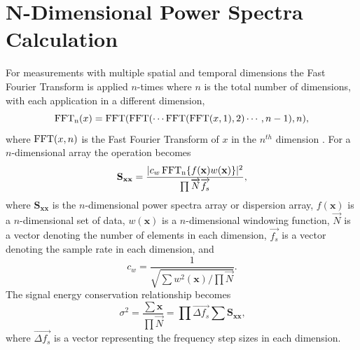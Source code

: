 \section{N-Dimensional Power Spectra Calculation}
For measurements with multiple spatial and temporal dimensions the Fast Fourier Transform is applied $n$-times where $n$ is the total number of dimensions, with each application in a different dimension,
\begin{equation}
 \operatorname{FFT_n}(x) = \operatorname{FFT}(\operatorname{FFT}(\cdots\operatorname{FFT}(\operatorname{FFT}(x,1),2)\cdots,n-1),n) \textrm{,}
 \label{eqn:04_fftn}
\end{equation}
where $\operatorname{FFT}(x,n)$ is the Fast Fourier Transform of $x$ in the $n^{th}$ dimension \cite{An-1991-QKg7heKm}.
For a $n$-dimensional array the operation becomes \cite{McClellan-1982-rGQzuZ7t}
\begin{equation}
 \mathbf{S_{xx}} =\frac{|c_w\operatorname{FFT_n}\{f(\mathbf{x}) w(\mathbf{x})\}|^2}{\prod{\overrightarrow{N}\overrightarrow{f_s}}} \textrm{,}
 \label{eqn:04_sxxn}
\end{equation}
where $\mathbf{S_{xx}}$ is the $n$-dimensional power spectra array or dispersion array, $f(\mathbf{x})$ is a $n$-dimensional set of data, $w(\mathbf{x})$ is a $n$-dimensional windowing function, $\overrightarrow{N}$ is a vector denoting the number of elements in each dimension, $\overrightarrow{f_s}$ is a vector denoting the sample rate in each dimension, and
\begin{equation}
 c_w = \frac{1}{\sqrt{\sum w^2(\mathbf{x})/\prod{\overrightarrow{N}}}} \textrm{.}
 \label{eqn:04_windown}
\end{equation}
The signal energy conservation relationship becomes
\begin{equation}
  \sigma^2=\frac{\sum\mathbf{x}}{\prod{\overrightarrow{N}}} = \prod{\overrightarrow{\Delta f_s}}\sum\mathbf{S_{xx}} \textrm{,}
  \label{eqn:04_fftn_energy_conservation}
\end{equation}
where $\overrightarrow{\Delta f_s}$ is a vector representing the frequency step sizes in each dimension.

